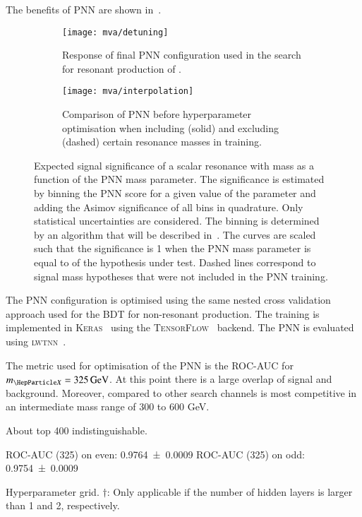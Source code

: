 The benefits of PNN are shown in~.

\begin{figure}[htbp]
  \centering

  \begin{subfigure}[t]{.49\textwidth}
    \texttt{[image: mva/detuning]}
    \caption{Response of final PNN configuration used in the search
      for resonant production of \HH.}
  \end{subfigure}\hfill%
  \begin{subfigure}[t]{.49\textwidth}
    \centering
    \texttt{[image: mva/interpolation]}
    \caption{Comparison of PNN before hyperparameter optimisation when
      including (solid) and excluding (dashed) certain resonance
      masses in training.}
  \end{subfigure}

  \caption{Expected signal significance of a scalar resonance with
    mass \mX as a function of the PNN mass parameter. The significance
    is estimated by binning the PNN score for a given value of the
    parameter and adding the Asimov significance of all bins in
    quadrature. Only statistical uncertainties are considered. The
    binning is determined by an algorithm that will be described
    in~. The curves are scaled such that the
    significance is 1 when the PNN mass parameter is equal to \mX of
    the hypothesis under test. Dashed lines correspond to signal mass
    hypotheses that were not included in the PNN training.}
  \label{fig:pnn_properties}
\end{figure}

The PNN configuration is optimised using the same nested cross
validation approach used for the BDT for non-resonant \HH
production. The training is implemented in \textsc{Keras}~\cite{keras}
using the \textsc{TensorFlow}~\cite{tensorflow2015-whitepaper}
backend. The PNN is evaluated using \textsc{lwtnn}~\cite{lwtnn}.

The metric used for optimisation of the PNN is the ROC-AUC for
$\mX = \SI{325}{\GeV}$. At this point there is a large overlap of
signal and background. Moreover, compared to other search channels
\bbtautau is most competitive in an intermediate mass range of 300 to
600 GeV.

About top 400 indistinguishable.

ROC-AUC (325) on even: \num{0.9764 +- 0.0009} ROC-AUC (325) on odd:
\num{0.9754 +- 0.0009}

\begin{table}[htbp]
  \centering
  
  \caption{Hyperparameter grid. $\dagger$: Only applicable if the
    number of hidden layers is larger than 1 and 2, respectively.}
  \label{tab:hyperparameter_grid_pnn}
\end{table}

